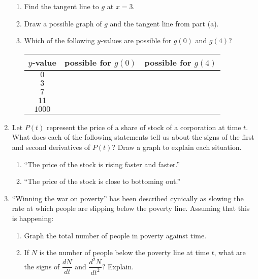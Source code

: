 \documentclass[11pt]{article}
\begin{document}
\begin{enumerate}
  \begin{enumerate}
  \item Find the tangent line to $g$ at $x=3$.
    \vfill
  \item Draw a possible graph of $g$ and the tangent line from part
    (a).
    \vfill
  \item Which of the following $y$-values are possible for $g(0)$ and $g(4)$?
    \begin{center}
      \begin{tabular}{|c|c|c|}
        \hline
        $y$-value & possible for $g(0)$ & possible for $g(4)$\\
        \hline
        $0$&&\\
        \hline
        $3$&&\\
        \hline
        $7$&&\\
        \hline
        $11$&&\\
        \hline
        $1000$&&\\
        \hline
      \end{tabular}
    \end{center}
  \end{enumerate}

  \newpage

\item Let $P(t)$ represent the price of a share of stock of a
  corporation at time $t$. What does each of the following statements
  tell us about the signs of the first and second derivatives of
  $P(t)$? Draw a graph to explain each situation.
  \begin{enumerate}
  \item ``The price of the stock is rising faster and faster.''
    \vfill
  \item ``The price of the stock is close to bottoming out.''
    \vfill
  \end{enumerate}

\newpage

\item ``Winning the war on poverty'' has been described cynically as
  slowing the rate at which people are slipping below the poverty
  line. Assuming that this is happening:
  \begin{enumerate}
  \item Graph the total number of people in poverty against time.
    \vfill
  \item If $N$ is the number of people below the poverty line at time
    $t$, what are the signs of $\dfrac{dN}{dt}$ and
    $\dfrac{d^2N}{dt^2}$? Explain.
    \vfill
  \end{enumerate}

\end{enumerate}
\end{document}

